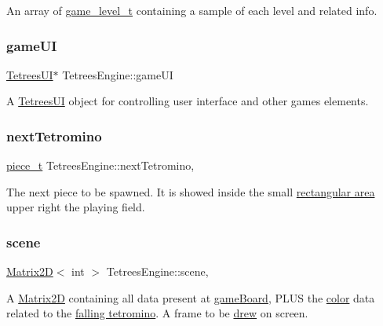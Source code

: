 An array of \hyperlink{structgame__level__t}{game\+\_\+level\+\_\+t} containing a sample of each level and related info. \mbox{\label{classTetreesEngine_a01bf1d438236d5f57129ffb22adf59ce}} 
\subsubsection{\texorpdfstring{game\+UI}{gameUI}}
{\footnotesize\ttfamily \hyperlink{classTetreesUI}{Tetrees\+UI}$\ast$ Tetrees\+Engine\+::game\+UI\hspace{0.3cm}{\ttfamily [private]}}

A \hyperlink{classTetreesUI}{Tetrees\+UI} object for controlling user interface and other games elements. \mbox{\label{classTetreesEngine_a44c902481f5d8a72ca8a78d24f5c3a33}} 
\subsubsection{\texorpdfstring{next\+Tetromino}{nextTetromino}}
{\footnotesize\ttfamily \hyperlink{structpiece__t}{piece\+\_\+t} Tetrees\+Engine\+::next\+Tetromino\hspace{0.3cm}{\ttfamily [static]}, {\ttfamily [private]}}

The next piece to be spawned. It is showed inside the small \hyperlink{TetreesUI_8cpp_aac997784ac88b494498d6e08d6fe62d5}{rectangular area} upper right the playing field. \mbox{\label{classTetreesEngine_aeade477c0bc2eaaa894ebbdaca93584e}} 
\subsubsection{\texorpdfstring{scene}{scene}}
{\footnotesize\ttfamily \hyperlink{classMatrix2D}{Matrix2D}$<$ int $>$ Tetrees\+Engine\+::scene\hspace{0.3cm}{\ttfamily [static]}, {\ttfamily [private]}}

A \hyperlink{classMatrix2D}{Matrix2D} containing all data present at \hyperlink{classTetreesEngine_a37d082a7816d6731b2703dd6d1a1cb97}{game\+Board}, P\+L\+US the \hyperlink{TetreesDefs_8hpp_a8ba5fbce2446135735693ab60c896bbd}{color} data related to the \hyperlink{classTetreesEngine_a26435ee2f02d9ba70d9e359745114f6e}{falling tetromino}. A frame to be \hyperlink{classTetreesUI_a357ae7240cc5f35b5d61244e7a6bcfe3}{drew} on screen. \mbox{\label{classTetreesEngine_a26435ee2f02d9ba70d9e359745114f6e}} 
